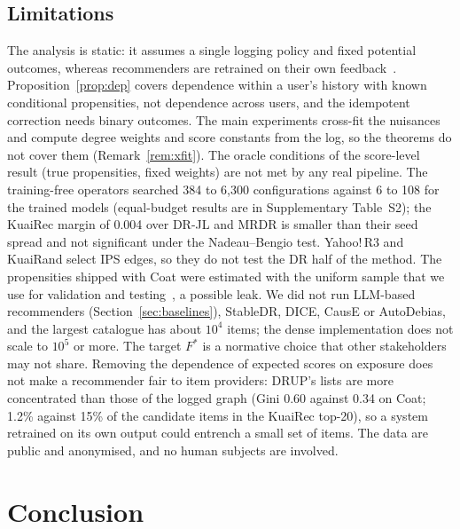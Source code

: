 \documentclass[preprint,review,12pt,authoryear]{elsarticle}
\theoremstyle{definition}
\begin{document}
\subsection{Limitations}
The analysis is static: it assumes a single logging policy and fixed potential
outcomes, whereas recommenders are retrained on their own
feedback~\citep{chaney2018confounding,hazrati2022evolution,perdomo2020performative}.
Proposition~\ref{prop:dep} covers dependence within a user's history with known
conditional propensities, not dependence across users, and the idempotent correction
needs binary outcomes. The main experiments cross-fit the nuisances and compute degree
weights and score constants from the log, so the theorems do not cover them
(Remark~\ref{rem:xfit}). The oracle conditions of the score-level result (true
propensities, fixed weights) are not met by any real pipeline. The training-free
operators searched 384 to 6{,}300 configurations against 6 to 108 for the trained models
(equal-budget results are in Supplementary Table~S2); the KuaiRec margin of
0.004 over DR-JL and MRDR is smaller than their seed spread and not significant under
the Nadeau--Bengio test. Yahoo!\,R3 and KuaiRand select IPS edges, so they do not test the
DR half of the method. The propensities shipped with Coat were estimated with the
uniform sample that we use for validation and testing~\citep{schnabel2016}, a
possible leak. We did not run LLM-based recommenders (Section~\ref{sec:baselines}),
StableDR, DICE, CausE or AutoDebias, and the largest catalogue has about $10^4$ items;
the dense implementation does not scale to $10^5$ or more. The target $F^*$ is a
normative choice that other stakeholders may not share. Removing the dependence of
expected scores on exposure does not make a recommender fair to item providers: DRUP's
lists are more concentrated than those of the logged graph (Gini 0.60 against 0.34 on
Coat; 1.2\% against 15\% of the candidate items in the KuaiRec top-20), so a system
retrained on its own output could entrench a small set of items. The data are public
and anonymised, and no human subjects are involved.

\section{Conclusion}
\end{document}
